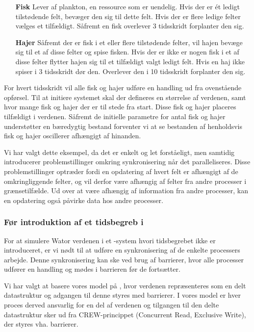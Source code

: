 \begin{itemize}
\item[\textbf{Fisk}]
Lever af plankton, en ressource som er uendelig. Hvis der er ét ledigt 
tilstødende felt, bevæger den sig til dette felt. Hvis der er flere ledige 
felter vælges et tilfældigt. Såfremt en fisk overlever 3 tidsskridt forplanter 
den sig.
\item[\textbf{Hajer}]
Såfremt der er fisk i et eller flere tilstødende felter, vil hajen bevæge sig 
til et af disse felter og spise fisken. Hvis der er ikke er nogen fisk i et af 
disse felter flytter hajen sig til et tilfældigt valgt ledigt felt. Hvis en haj 
ikke spiser i 3 tidsskridt dør den. Overlever den i 10 tidsskridt forplanter 
den sig.
\end{itemize}

For hvert tidsskridt vil alle fisk og hajer udføre en handling ud fra
ovenstående opførsel.
Til at initiere systemet skal der defineres en størrelse af verdenen,
samt hvor mange fisk og hajer der er til stede fra start. Disse fisk og
hajer placeres tilfældigt i verdenen.
Såfremt de initielle parametre for antal fisk og hajer understøtter en 
bæredygtig bestand forventer vi at se bestanden af henholdsvis fisk og hajer 
oscillerer afhængigt af hinanden.

Vi har valgt dette eksempel, da det er enkelt og let forståeligt, men samtidig 
introducerer problemstillinger omkring synkronisering når det paralleliseres.  
Disse problemstillinger optræder fordi en opdatering af hvert felt er afhængigt 
af de omkringliggende felter, og vil derfor være afhængig af felter fra andre 
processer i grænsetilfælde. Ud over at være afhængig af information fra andre 
processer, kan en opdatering også påvirke data hos andre processer.   

\subsubsection{Før introduktion af et tidsbegreb i \csp} For at simulere Wator 
verdenen i et \csp-system hvori tidsbegrebet ikke er introduceret, er vi nødt 
til at udføre en synkronisering af de enkelte processers arbejde. Denne 
synkronisering kan ske ved brug af barrierer, hvor alle processer udfører en 
handling og mødes i barrieren før de fortsætter.

Vi har valgt at basere vores model på \cite{crew}, hvor verdenen repræsenteres 
som en delt datastruktur og adgangen til denne styres med barrierer. I vores 
model er hver proces derved ansvarlig for en del af verdenen og tilgangen til 
den delte datastruktur sker ud fra CREW-princippet (Concurrent Read, Exclusive 
Write)\cite[5]{crew}, der styres vha. barrierer.  

